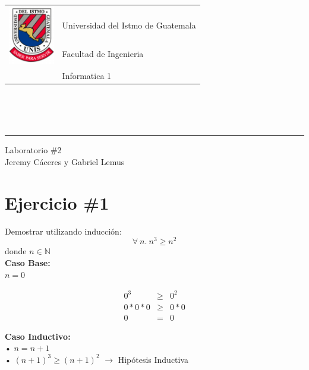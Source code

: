\documentclass[11pt,letterpaper]{article}
\begin{document}
\begin{tabular}{l l}
\multirow{3}{*}{\includegraphics[width=2cm]{../../recursos/logo}} 
 & \\
 & \LARGE Universidad del Istmo de Guatemala \\
 & \LARGE Facultad de Ingenieria \\
 & \LARGE Informatica 1 \\
\end{tabular}
\\\\\\

\begin{center}
	\hrule
	\vspace{0.5cm}
	\huge{Laboratorio \#2} \\
	\vspace{0.1cm}
    \Large{Jeremy Cáceres y Gabriel Lemus}\\
    \vspace{0.05cm}
    \hrulefill
\end{center}
\vspace{0.3cm}

\section*{\Large Ejercicio \#1}
\noindent Demostrar utilizando inducción:
\[
        \forall\ n.\ n^3\geq n^2
\]
donde $n\in\mathbb{N}$
\\

\noindent \textbf{\large Caso Base:}\\
\noindent $n=0$

\begin{eqnarray*}
0^3 &\geq& 0^2 \\
0*0*0 &\geq& 0*0 \\
0 &=& 0
\end{eqnarray*}

\vspace{0.1cm}

\noindent \textbf{\large Caso Inductivo:}\\
\noindent • $n=n+1$ \\
\noindent • $(n+1)^3\geq(n+1)^2$ $\rightarrow$ Hipótesis Inductiva \\
\end{document}
